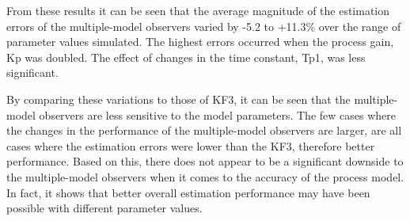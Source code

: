 From these results it can be seen that the average magnitude of the estimation errors of the multiple-model observers varied by -5.2 to +11.3\% over the range of parameter values simulated. The highest errors occurred when the process gain, \gls{Kp} was doubled. The effect of changes in the time constant, \gls{Tp1}, was less significant.

By comparing these variations to those of KF3, it can be seen that the multiple-model observers are less sensitive to the model parameters. The few cases where the changes in the performance of the multiple-model observers are larger, are all cases where the estimation errors were lower than the KF3, therefore better performance. Based on this, there does not appear to be a significant downside to the multiple-model observers when it comes to the accuracy of the process model. In fact, it shows that better overall estimation performance may have been possible with different parameter values.

